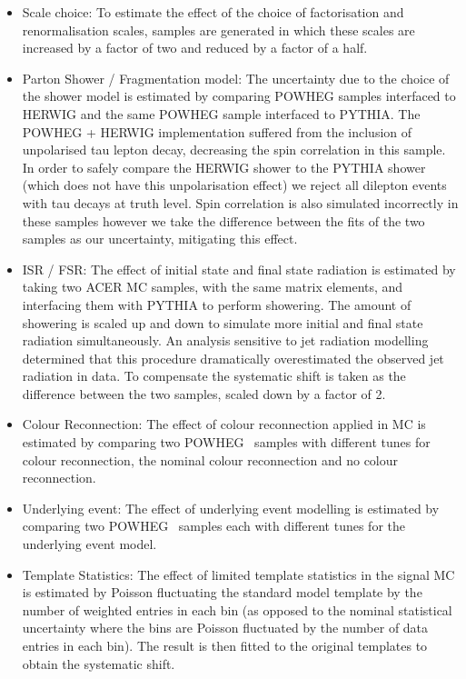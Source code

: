\begin{itemize}
    \item Scale choice: To estimate the effect of the choice of factorisation and renormalisation scales, samples are generated in which these scales are increased by a factor of two and reduced by a factor of a half.%

    \item Parton Shower / Fragmentation model: The uncertainty due to the choice of the shower model is estimated by comparing POWHEG samples interfaced to HERWIG and the same POWHEG sample interfaced to PYTHIA. The POWHEG + HERWIG implementation suffered from the inclusion of unpolarised tau lepton decay, decreasing the spin correlation in this sample. In order to safely compare the HERWIG shower to the PYTHIA shower (which does not have this unpolarisation effect) we reject all dilepton events with tau decays at truth level. Spin correlation is also simulated incorrectly in these samples however we take the difference between the fits of the two samples as our uncertainty, mitigating this effect.

    \item ISR / FSR: The effect of initial state and final state radiation is estimated by taking two ACER MC samples, with the same matrix elements, and interfacing them with PYTHIA to perform showering. The amount of showering is scaled up and down to simulate more initial and final state radiation simultaneously. An analysis sensitive to jet radiation modelling determined that this procedure dramatically overestimated the observed jet radiation in data. %
 To compensate the systematic shift is taken as the difference between the two samples, scaled down by a factor of 2.

    \item Colour Reconnection: The effect of colour reconnection applied in MC is estimated by comparing two POWHEG \ttbar\ samples with different tunes for colour reconnection, the nominal colour reconnection and no colour reconnection. 

    \item Underlying event: The effect of underlying event modelling is estimated by comparing two POWHEG \ttbar\ samples each with different tunes for the underlying event model.

    \item Template Statistics: The effect of limited template statistics in the signal MC is estimated by Poisson fluctuating the standard model template by the number of weighted entries in each bin (as opposed to the nominal statistical uncertainty where the bins are Poisson fluctuated by the number of data entries in each bin). The result is then fitted to the original templates to obtain the systematic shift. 

\end{itemize}

